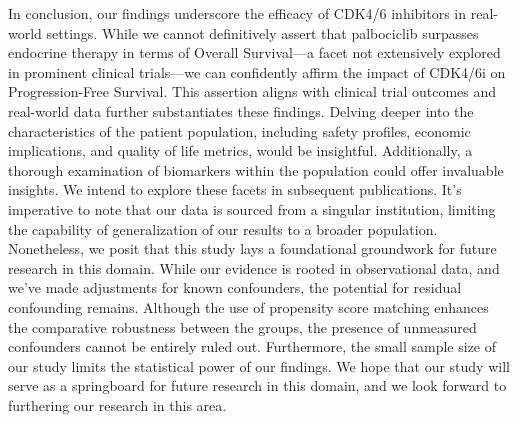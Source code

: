 In conclusion, our findings underscore the efficacy of CDK4/6 inhibitors in real-world settings. While we cannot definitively assert that palbociclib surpasses endocrine therapy in terms of Overall Survival—a facet not extensively explored in prominent clinical trials—we can confidently affirm the impact of CDK4/6i on Progression-Free Survival. This assertion aligns with clinical trial outcomes and real-world data further substantiates these findings.
Delving deeper into the characteristics of the patient population, including safety profiles, economic implications, and quality of life metrics, would be insightful. Additionally, a thorough examination of biomarkers within the population could offer invaluable insights. We intend to explore these facets in subsequent publications.
It’s imperative to note that our data is sourced from a singular institution, limiting the capability of generalization of our results to a broader population. Nonetheless, we posit that this study lays a foundational groundwork for future research in this domain. While our evidence is rooted in observational data, and we’ve made adjustments for known confounders, the potential for residual confounding remains. Although the use of propensity score matching enhances the comparative robustness between the groups, the presence of unmeasured confounders cannot be entirely ruled out. Furthermore, the small sample size of our study limits the statistical power of our findings. We hope that our study will serve as a springboard for future research in this domain, and we look forward to furthering our research in this area.